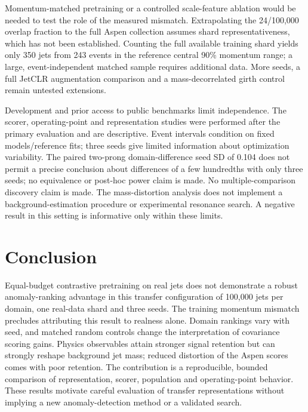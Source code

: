 \documentclass[11pt,a4paper]{article}
\begin{document}
Momentum-matched pretraining or a controlled scale-feature ablation would be needed
to test the role of the measured mismatch. Extrapolating the 24/100,000 overlap
fraction to the full Aspen collection assumes shard representativeness, which
has not been established. Counting the full available training shard yields only
350 jets from 243 events in the reference central 90\% momentum range; a
large, event-independent matched sample requires additional data. More seeds,
a full JetCLR augmentation comparison and a
mass-decorrelated girth control remain untested extensions.

Development and prior access to public benchmarks limit independence. The scorer,
operating-point and representation studies were performed after the primary
evaluation and are descriptive. Event intervals
condition on fixed models/reference fits; three seeds give limited information
about optimization variability. The paired two-prong domain-difference seed SD
of 0.104 does not permit a precise conclusion about differences of a few hundredths
with only three seeds; no equivalence or post-hoc power claim is made. No multiple-comparison discovery claim is
made. The mass-distortion analysis does not implement a background-estimation
procedure or experimental resonance search. A negative result in this setting
is informative only within these limits.

\section{Conclusion}
Equal-budget contrastive pretraining on real jets does not demonstrate a robust
anomaly-ranking advantage in this transfer configuration of 100,000 jets per
domain, one real-data shard and three seeds. The training momentum mismatch
precludes attributing this result to realness alone. Domain rankings vary
with seed, and matched random controls change the interpretation of covariance
scoring gains. Physics observables attain stronger signal retention but can
strongly reshape background jet mass; reduced distortion of the Aspen scores
comes with poor retention. The contribution is a reproducible, bounded comparison
of representation, scorer, population and operating-point behavior. These
results motivate careful evaluation of transfer representations without implying
a new anomaly-detection method or a validated search.
\end{document}
